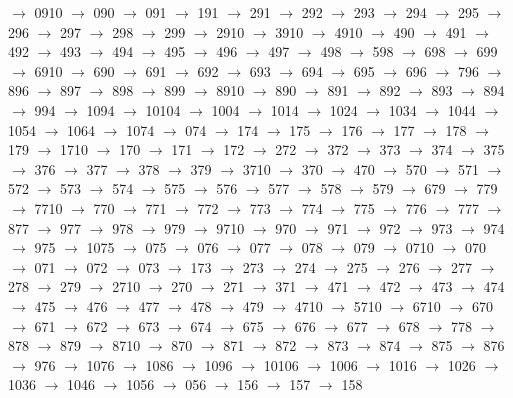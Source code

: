 $\rightarrow$ 0910 $\rightarrow$ 090 $\rightarrow$ 091 $\rightarrow$ 191 $\rightarrow$ 291 $\rightarrow$ 292 $\rightarrow$ 293 $\rightarrow$ 294 $\rightarrow$ 295 $\rightarrow$ 296 $\rightarrow$ 297 $\rightarrow$ 298 $\rightarrow$ 299 $\rightarrow$ 2910 $\rightarrow$ 3910 $\rightarrow$ 4910 $\rightarrow$ 490 $\rightarrow$ 491 $\rightarrow$ 492 $\rightarrow$ 493 $\rightarrow$ 494 $\rightarrow$ 495 $\rightarrow$ 496 $\rightarrow$ 497 $\rightarrow$ 498 $\rightarrow$ 598 $\rightarrow$ 698 $\rightarrow$ 699 $\rightarrow$ 6910 $\rightarrow$ 690 $\rightarrow$ 691 $\rightarrow$ 692 $\rightarrow$ 693 $\rightarrow$ 694 $\rightarrow$ 695 $\rightarrow$ 696 $\rightarrow$ 796 $\rightarrow$ 896 $\rightarrow$ 897 $\rightarrow$ 898 $\rightarrow$ 899 $\rightarrow$ 8910 $\rightarrow$ 890 $\rightarrow$ 891 $\rightarrow$ 892 $\rightarrow$ 893 $\rightarrow$ 894 $\rightarrow$ 994 $\rightarrow$ 1094 $\rightarrow$ 10104 $\rightarrow$ 1004 $\rightarrow$ 1014 $\rightarrow$ 1024 $\rightarrow$ 1034 $\rightarrow$ 1044 $\rightarrow$ 1054 $\rightarrow$ 1064 $\rightarrow$ 1074 $\rightarrow$ 074 $\rightarrow$ 174 $\rightarrow$ 175 $\rightarrow$ 176 $\rightarrow$ 177 $\rightarrow$ 178 $\rightarrow$ 179 $\rightarrow$ 1710 $\rightarrow$ 170 $\rightarrow$ 171 $\rightarrow$ 172 $\rightarrow$ 272 $\rightarrow$ 372 $\rightarrow$ 373 $\rightarrow$ 374 $\rightarrow$ 375 $\rightarrow$ 376 $\rightarrow$ 377 $\rightarrow$ 378 $\rightarrow$ 379 $\rightarrow$ 3710 $\rightarrow$ 370 $\rightarrow$ 470 $\rightarrow$ 570 $\rightarrow$ 571 $\rightarrow$ 572 $\rightarrow$ 573 $\rightarrow$ 574 $\rightarrow$ 575 $\rightarrow$ 576 $\rightarrow$ 577 $\rightarrow$ 578 $\rightarrow$ 579 $\rightarrow$ 679 $\rightarrow$ 779 $\rightarrow$ 7710 $\rightarrow$ 770 $\rightarrow$ 771 $\rightarrow$ 772 $\rightarrow$ 773 $\rightarrow$ 774 $\rightarrow$ 775 $\rightarrow$ 776 $\rightarrow$ 777 $\rightarrow$ 877 $\rightarrow$ 977 $\rightarrow$ 978 $\rightarrow$ 979 $\rightarrow$ 9710 $\rightarrow$ 970 $\rightarrow$ 971 $\rightarrow$ 972 $\rightarrow$ 973 $\rightarrow$ 974 $\rightarrow$ 975 $\rightarrow$ 1075 $\rightarrow$ 075 $\rightarrow$ 076 $\rightarrow$ 077 $\rightarrow$ 078 $\rightarrow$ 079 $\rightarrow$ 0710 $\rightarrow$ 070 $\rightarrow$ 071 $\rightarrow$ 072 $\rightarrow$ 073 $\rightarrow$ 173 $\rightarrow$ 273 $\rightarrow$ 274 $\rightarrow$ 275 $\rightarrow$ 276 $\rightarrow$ 277 $\rightarrow$ 278 $\rightarrow$ 279 $\rightarrow$ 2710 $\rightarrow$ 270 $\rightarrow$ 271 $\rightarrow$ 371 $\rightarrow$ 471 $\rightarrow$ 472 $\rightarrow$ 473 $\rightarrow$ 474 $\rightarrow$ 475 $\rightarrow$ 476 $\rightarrow$ 477 $\rightarrow$ 478 $\rightarrow$ 479 $\rightarrow$ 4710 $\rightarrow$ 5710 $\rightarrow$ 6710 $\rightarrow$ 670 $\rightarrow$ 671 $\rightarrow$ 672 $\rightarrow$ 673 $\rightarrow$ 674 $\rightarrow$ 675 $\rightarrow$ 676 $\rightarrow$ 677 $\rightarrow$ 678 $\rightarrow$ 778 $\rightarrow$ 878 $\rightarrow$ 879 $\rightarrow$ 8710 $\rightarrow$ 870 $\rightarrow$ 871 $\rightarrow$ 872 $\rightarrow$ 873 $\rightarrow$ 874 $\rightarrow$ 875 $\rightarrow$ 876 $\rightarrow$ 976 $\rightarrow$ 1076 $\rightarrow$ 1086 $\rightarrow$ 1096 $\rightarrow$ 10106 $\rightarrow$ 1006 $\rightarrow$ 1016 $\rightarrow$ 1026 $\rightarrow$ 1036 $\rightarrow$ 1046 $\rightarrow$ 1056 $\rightarrow$ 056 $\rightarrow$ 156 $\rightarrow$ 157 $\rightarrow$ 158 